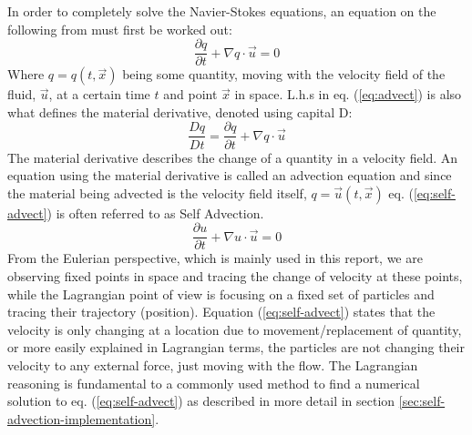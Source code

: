 In order to completely solve the Navier-Stokes equations, an equation on the following from must first be worked out:
\begin{equation}\label{eq:advect}\frac{\partial q}{\partial t} +\nabla q \cdot \vec{u}= 0\end{equation}
Where \begin{math}q= q(t,\vec{x})\end{math} being some quantity, moving with the velocity field of the fluid, \begin{math}\vec{u}\end{math}, at a certain time \begin{math}t\end{math} and point \begin{math}\vec{x}\end{math} in space. L.h.s in eq. (\ref{eq:advect}) is also what defines the material derivative, denoted using capital D:
\begin{equation}\frac{Dq}{Dt} = \frac{\partial q}{\partial t} +\nabla q \cdot \vec{u}\end{equation}
The material derivative describes the change of a quantity in a velocity field. An equation using the material derivative is called an advection equation and since the material being advected is the velocity field itself, \begin{math}q = \vec{u}(t,\vec{x})\end{math} eq. (\ref{eq:self-advect}) is often referred to as Self Advection.
\begin{equation}\label{eq:self-advect}\frac{\partial u}{\partial t} +\nabla u \cdot \vec{u}= 0\end{equation}
From the Eulerian perspective, which is mainly used in this report, we are observing fixed points in space and tracing the change of velocity at these points, while the Lagrangian point of view is focusing on a fixed set of particles and tracing their trajectory (position). Equation (\ref{eq:self-advect}) states that the velocity is only changing at a location due to movement/replacement of quantity, or more easily explained in Lagrangian terms, the particles are not changing their velocity to any external force, just moving with the flow. The Lagrangian reasoning is fundamental to a commonly used method to find a numerical solution to eq. (\ref{eq:self-advect}) as described in more detail in section \ref{sec:self-advection-implementation}.

